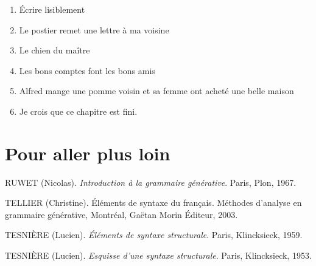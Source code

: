 \begin{keybox}
\renewcommand{\thempfootnote}{校\arabic{editorialnote}}
\begin{enumerate}[label=\arabic*.,leftmargin=1.6em]
\item Écrire lisiblement
\item Le postier remet une lettre à ma voisine
\item Le chien du maître
\item Les bons comptes font les bons amis
\item Alfred mange une pomme voisin et sa femme ont acheté une belle maison
\item Je crois que ce chapitre est fini.
\end{enumerate}
\end{keybox}

\section*{Pour aller plus loin}
\begingroup\small
\begin{description}[font=\normalfont,leftmargin=1.3em,labelindent=0pt,style=nextline]
\item[] RUWET (Nicolas). \textit{Introduction à la grammaire générative}. Paris, Plon, 1967.
\item[] TELLIER (Christine). Éléments de syntaxe du français. Méthodes d’analyse en grammaire générative, Montréal, Gaëtan Morin Éditeur, 2003.
\item[] TESNIÈRE (Lucien). \textit{Éléments de syntaxe structurale}. Paris, Klincksieck, 1959.
\item[] TESNIÈRE (Lucien). \textit{Esquisse d’une syntaxe structurale}. Paris, Klincksieck, 1953.
\end{description}
\endgroup

\clearpage
{}
